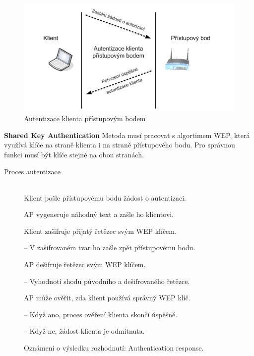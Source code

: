 \begin{figure}[ht]
\centering
  \begin{center}
    \includegraphics[scale=0.5]{BPC-HWS/images/OSA.png}
  \end{center}
  \caption[Autentizace klienta přístupovým bodem]{Autentizace klienta přístupovým bodem}
\end{figure}
\textbf{Shared Key Authentication} Metoda musí pracovat s algortimem WEP, která využívá klíče na straně klienta i na straně přístupového bodu. Pro správnou funkci musí být klíče stejné na obou stranách.
\begin{description}
    \item [Proces autentizace] \hfill \\
    Klient pošle přístupovému bodu žádost o autentizaci. \par
    AP vygeneruje náhodný text a zašle ho klientovi. \par
    Klient zašifruje přijatý řetězec svým WEP klíčem. \par
    -- V zašifrovaném tvar ho zašle zpět přístupovému bodu. \par
    AP dešifruje řetězec svým WEP klíčem. \par
    -- Vyhodnotí shodu původního a dešifrovaného řetězce. \par
    AP může ověřit, zda klient používá správný WEP klíč. \par
    -- Když ano, proces ověření klienta skončí úspěšně. \par
    -- Když ne, žádost klienta je odmítnuta. \par
    Oznámení o výsledku rozhodnutí: Authentication response. \par
\end{description}
